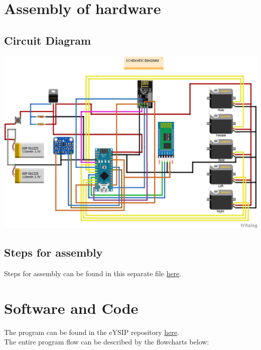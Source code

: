 \documentclass[a4paper,12pt,oneside]{book}
\begin{document}
\pagebreak

\section{Assembly of hardware}

\subsection{Circuit Diagram}
\includegraphics[scale=0.6]{Modular_Schematic_bb.jpg}

\subsection{Steps for assembly}
Steps for assembly can be found in this separate file \href{./Assembly steps for Dtto v2 Module.pdf}{here}.



\pagebreak

\section{Software and Code}

The program can be found in the eYSIP repository 
\href{https://github.com/eYSIP-2017/eYSIP-2017_Modular-Robot}{here}.\\

\noindent The entire program flow can be described by the flowcharts below:
\end{document}
